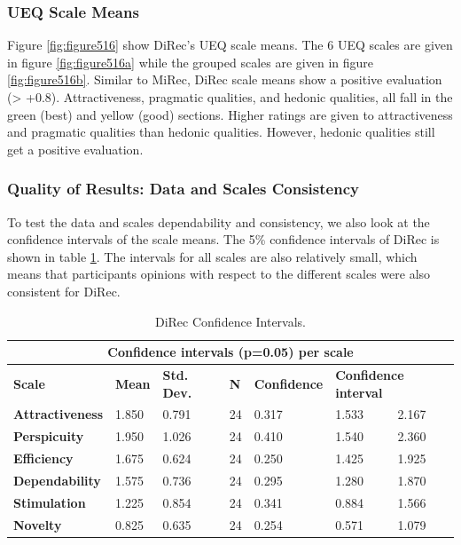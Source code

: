 \subsubsection{UEQ Scale Means}
Figure \ref{fig:figure516} show DiRec's UEQ scale means. The 6 UEQ scales are
given in figure \ref{fig:figure516a} while the grouped scales are given in
figure \ref{fig:figure516b}. Similar to MiRec, DiRec scale means show a
positive evaluation (> +0.8). Attractiveness, pragmatic qualities, and hedonic qualities,
all fall in the green (best) and yellow (good) sections. Higher ratings are
given to attractiveness and pragmatic qualities than hedonic qualities. However,
hedonic qualities still get a positive evaluation.


\subsubsection{Quality of Results: Data and Scales Consistency}
To test the data and scales dependability and consistency, we also look at
the confidence intervals of the scale means. The 5\% confidence intervals of
DiRec is shown in table \ref{table:table57}. The intervals for all scales are
also relatively small, which means that participants opinions with respect to
the different scales were also consistent for DiRec.
\begin{table}[!htbp]
\tiny
\centering
\begin{tabular}{|l|l|l|l|l|l|l|}
\hline
\multicolumn{7}{|c|}{\textbf{Confidence intervals (p=0.05) per scale}}         
\\\hline \textbf{Scale}          & \textbf{Mean} & \textbf{Std. Dev.} &
\textbf{N} &\textbf{Confidence} & \multicolumn{2}{l|}{\textbf{Confidence interval}} \\\hline \textbf{Attractiveness} & 1.850         & 0.791              & 24         &0.317               & 1.533                   & 2.167                  \\\hline 
\textbf{Perspicuity}    & 1.950         & 1.026              & 24         &
0.410               & 1.540                   & 2.360                 \\\hline
\textbf{Efficiency}     & 1.675         & 0.624              & 24         &
0.250               & 1.425                   & 1.925                 \\\hline
\textbf{Dependability}  & 1.575         & 0.736              & 24         &
0.295               & 1.280                   & 1.870                 \\\hline
\textbf{Stimulation}    & 1.225         & 0.854              & 24         &
0.341               & 0.884                   & 1.566                 \\\hline
\textbf{Novelty}        & 0.825         & 0.635              & 24         &
0.254               & 0.571                   & 1.079  \\\hline
\end{tabular}
\caption{DiRec Confidence Intervals.}
\label{table:table57}
\end{table}
